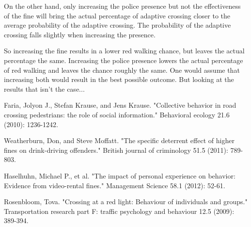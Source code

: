 \documentclass[a4paper]{article}
\begin{document}
On the other hand, only increasing the police presence but not the effectiveness of the fine will bring the actual percentage of adaptive crossing closer to the average probability of the adaptive crossing. The probability of the adaptive crossing falls slightly when increasing the presence.

So increasing the fine results in a lower red walking chance, but leaves the actual percentage the same. Increasing the police presence lowers the actual percentage of red walking and leaves the chance roughly the same. One would assume that increasing both would result in the best possible outcome. But looking at the results that isn't the case...

\clearpage

\begin{thebibliography}{3}

	 Faria, Jolyon J., Stefan Krause, and Jens Krause. "Collective behavior in road crossing pedestrians: the role of social information." Behavioral ecology 21.6 (2010): 1236-1242.

	 Weatherburn, Don, and Steve Moffatt. "The specific deterrent effect of higher fines on drink-driving offenders." British journal of criminology 51.5 (2011): 789-803.
    
     Haselhuhn, Michael P., et al. "The impact of personal experience on behavior: Evidence from video-rental fines." Management Science 58.1 (2012): 52-61.
    
	 Rosenbloom, Tova. "Crossing at a red light: Behaviour of individuals and groups." Transportation research part F: traffic psychology and behaviour 12.5 (2009): 389-394.
	
\end{thebibliography}
\end{document}
